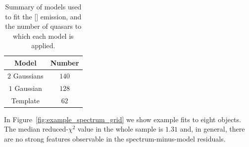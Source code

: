 \begin{table}
  \centering
  \footnotesize 
    \begin{tabular}{cc} 
    \hline
    Model & Number \\
    \hline
    $2$ Gaussians &  $140$ \\
    $1$ Gaussian  &  $128$ \\
    Template &  $62$ \\
    \hline
    \end{tabular}
    \caption[{Summary of models used to fit the [] emission, and the number of quasars to which each model is applied.}]{Summary of models used to fit the [] emission, and the number of quasars to which each model is applied.}
  \label{tab:oiiimod}
\end{table} 

In Figure~\ref{fig:example_spectrum_grid} we show example fits to eight objects. 
The median reduced-$\chi^2$ value in the whole sample is $1.31$ and, in general, there are no strong features observable in the spectrum-minus-model residuals.

